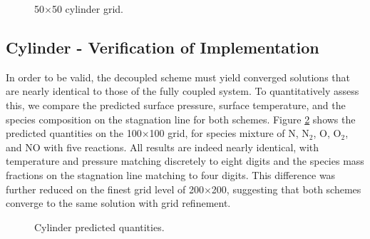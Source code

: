 \begin{figure}[h]
	\centering
	\caption{50$\times$50 cylinder grid.}
  \label{grid}
\end{figure}

\subsection{Cylinder - Verification of Implementation}

In order to be valid, the decoupled scheme must yield converged solutions that
are nearly identical to those of the fully coupled system. To quantitatively
assess this, we compare the predicted surface pressure, surface temperature, and
the species composition on the stagnation line for both schemes.  Figure
\ref{pq} shows the predicted quantities on the 100$\times$100 grid, for species
mixture of N, $\text{N}_2$, O, $\text{O}_2$, and NO with five reactions. All
results are indeed nearly identical, with temperature and pressure matching
discretely to eight digits and the species mass fractions on the stagnation line
matching to four digits.  This difference was further reduced on the finest grid
level of 200$\times$200, suggesting that both schemes converge to the same
solution with grid refinement.
\begin{figure}[h!]
  \captionsetup[subfigure]{position=b}
  \centering
	\caption{Cylinder predicted quantities.}
	\label{pq}
\end{figure}

